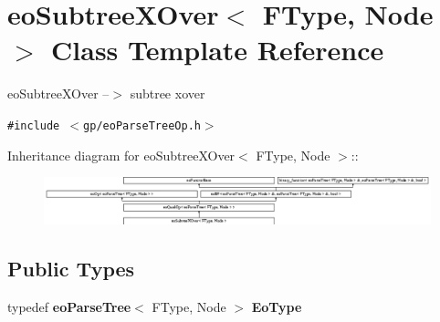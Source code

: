 \section{eo\-Subtree\-XOver$<$ FType, Node $>$ Class Template Reference}
\label{classeo_subtree_x_over}
eo\-Subtree\-XOver --$>$ subtree xover  


{\tt \#include $<$gp/eo\-Parse\-Tree\-Op.h$>$}

Inheritance diagram for eo\-Subtree\-XOver$<$ FType, Node $>$::\begin{figure}[H]
\begin{center}
\leavevmode
\includegraphics[height=1.36752cm]{classeo_subtree_x_over}
\end{center}
\end{figure}
\subsection*{Public Types}
\begin{CompactItemize}
\item 
typedef {\bf eo\-Parse\-Tree}$<$ FType, Node $>$ {\bf Eo\-Type}\label{classeo_subtree_x_over_w0}

\end{CompactItemize}
